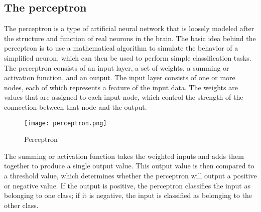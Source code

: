 \subsection{The perceptron}
The perceptron is a type of artificial neural network that is loosely modeled after the structure
and function of real neurons in the brain. The basic idea behind the perceptron is to use a
mathematical algorithm to simulate the behavior of a simplified neuron, which can then be used to
perform simple classification tasks.\\
The perceptron consists of an input layer, a set of weights, a summing or activation function,
and an output.
The input layer consists of one or more nodes, each of which represents a feature of the input data.
The weights are values that are assigned to each input node, which control the strength of the
connection between that node and the output.
\begin{figure}[h]
  \centering
  \texttt{[image: perceptron.png]}
  \caption{Perceptron}
\end{figure}

The summing or activation function takes the weighted inputs and adds them together to produce a
single output
value. This output value is then compared to a threshold value, which determines whether the
perceptron will output a positive or negative value. If the output is positive, the perceptron
classifies the input as belonging to one class; if it is negative, the input is classified as
belonging to the other class.

